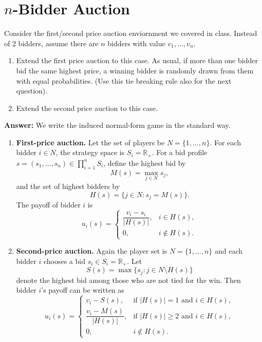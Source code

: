 \documentclass[12pt,a4paper]{article}
\begin{document}
\maketitle

\section{\texorpdfstring{$n$}{n}-Bidder Auction}
Consider the first/second price auction enviornment we covered in class. Instead of 2 bidders, assume there are $n$ bidders with value $v_1,\dots,v_n$.
\begin{enumerate}[label=(\alph*)]
  \item Extend the first price auction to this case. As usual, if more than one bidder bid the same highest price, a winning bidder is randomly drawn from them with equal probabilities. (Use this tie breaking rule also for the next question).
  \item Extend the second price auction to this case.
\end{enumerate}

\vspace{0.5cm}

\noindent\textbf{Answer:} We write the induced normal-form game in the standard way.

\begin{enumerate}[label=(\alph*)]
  \item \textbf{First-price auction.} Let the set of players be $N=\{1,\dots,n\}$. For each bidder $i\in N$, the strategy space is $S_i=\mathbb{R}_{+}$. For a bid profile $s=(s_1,\dots,s_n)\in \prod_{i=1}^n S_i$, define the highest bid by
  \[
    M(s)=\max_{j\in N} s_j,
  \]
  and the set of highest bidders by
  \[
    H(s)=\{j\in N: s_j=M(s)\}.
  \]
  The payoff of bidder $i$ is
  \[
    u_i(s)=
    \begin{cases}
      \dfrac{v_i-s_i}{|H(s)|}, & i\in H(s),\\[6pt]
      0, & i\notin H(s).
    \end{cases}
  \]

  \item \textbf{Second-price auction.} Again the player set is $N=\{1,\dots,n\}$ and each bidder $i$ chooses a bid $s_i\in S_i=\mathbb{R}_{+}$. Let
  \[
    S(s)=\max\{s_j: j\in N\setminus H(s)\}
  \]
  denote the highest bid among those who are not tied for the win. Then bidder $i$'s payoff can be written as
  \[
    u_i(s)=
    \begin{cases}
      v_i-S(s), & \text{if } |H(s)|=1 \text{ and } i\in H(s),\\[6pt]
      \dfrac{v_i-M(s)}{|H(s)|}, & \text{if } |H(s)|\ge 2 \text{ and } i\in H(s),\\[6pt]
      0, & i\notin H(s).
    \end{cases}
  \]
\end{enumerate}
\end{document}
